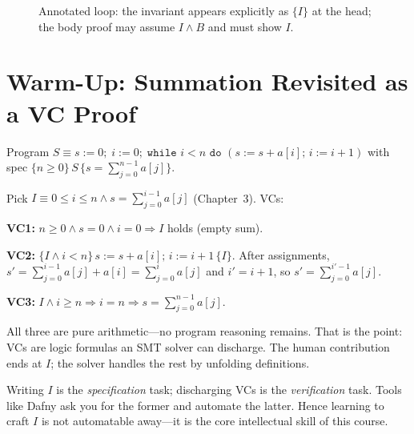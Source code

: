\begin{figure}[h]\centering
{}
\caption{Annotated loop: the invariant appears explicitly as $\{I\}$ at the head; the body proof may assume $I\land B$ and must show $I$.}
\label{fig:annotated-loop}
\end{figure}

\section{Warm-Up: Summation Revisited as a VC Proof}
\label{sec:sum-vc}
Program $S\equiv s:=0;\;i:=0;\;\texttt{while }i<n\texttt{ do }(s:=s+a[i];\,i:=i+1)$ with spec $\{n\ge0\}\,S\,\{s=\sum_{j=0}^{n-1}a[j]\}$.

Pick $I\equiv 0\le i\le n\land s=\sum_{j=0}^{i-1}a[j]$ (Chapter~3). VCs:

\textbf{VC1:} $n\ge0\land s=0\land i=0 \Rightarrow I$ holds (empty sum).

\textbf{VC2:} $\{I\land i<n\}\,s:=s+a[i];\,i:=i+1\,\{I\}$. After assignments, $s'=\sum_{j=0}^{i-1}a[j]+a[i]=\sum_{j=0}^{i}a[j]$ and $i'=i+1$, so $s'=\sum_{j=0}^{i'-1}a[j]$.

\textbf{VC3:} $I\land i\ge n\Rightarrow i=n\Rightarrow s=\sum_{j=0}^{n-1}a[j]$.

All three are pure arithmetic—no program reasoning remains. That is the point: VCs are logic formulas an SMT solver can discharge. The human contribution ends at $I$; the solver handles the rest by unfolding definitions.

\begin{remark}
Writing $I$ is the \emph{specification} task; discharging VCs is the \emph{verification} task. Tools like Dafny ask you for the former and automate the latter. Hence learning to craft $I$ is not automatable away—it is the core intellectual skill of this course.
\end{remark}


